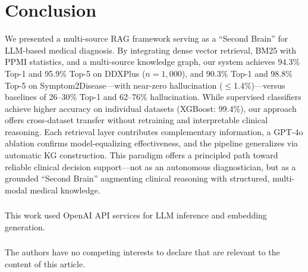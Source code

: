 \documentclass[runningheads]{llncs}
\begin{document}
\section{Conclusion}
\label{sec:conclusion}

We presented a multi-source RAG framework serving as a ``Second Brain'' for LLM-based medical diagnosis. By integrating dense vector retrieval, BM25 with PPMI statistics, and a multi-source knowledge graph, our system achieves 94.3\% Top-1 and 95.9\% Top-5 on DDXPlus ($n{=}1{,}000$), and 90.3\% Top-1 and 98.8\% Top-5 on Symptom2Disease---with near-zero hallucination ($\leq$1.4\%)---versus baselines of 26--30\% Top-1 and 62--76\% hallucination. While supervised classifiers achieve higher accuracy on individual datasets (XGBoost: 99.4\%), our approach offers cross-dataset transfer without retraining and interpretable clinical reasoning. Each retrieval layer contributes complementary information, a GPT-4o ablation confirms model-equalizing effectiveness, and the pipeline generalizes via automatic KG construction. This paradigm offers a principled path toward reliable clinical decision support---not as an autonomous diagnostician, but as a grounded ``Second Brain'' augmenting clinical reasoning with structured, multi-modal medical knowledge.

\begin{credits}
\subsubsection{\ackname}
This work used OpenAI API services for LLM inference and embedding generation.

\subsubsection{\discintname}
The authors have no competing interests to declare that are relevant to the content of this article.
\end{credits}

\end{document}
